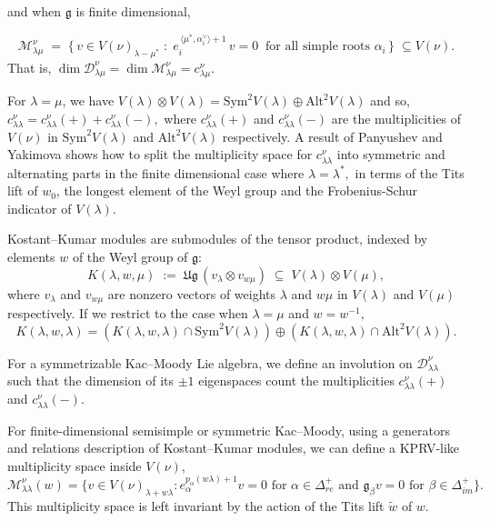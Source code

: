 \documentclass[12pt,reqno]{amsart}
\theoremstyle{plain}
\theoremstyle{definition}
\theoremstyle{plain}
\newcommand{\posreal}[1][+]{\Delta_{re}^{#1}}
\newcommand{\posimag}{\Delta_{im}^+}
\newcommand{\lie}{\mathfrak}
\newcommand{\lr}{c_{\lambda\mu}^\nu}
\begin{document}
and when $\mathfrak g$ is finite dimensional, 

\[
    \mathcal{M}_{\lambda\mu}^{\nu} \;=\;\bigl\{\,v\in V(\nu)_{\lambda-\mu^*}\;:\;
    e_i^{\,\langle\mu^*,\alpha_i^\vee\rangle+1}\,v=0\ \text{ for all simple roots } \alpha_i\,\bigr\} \;\subseteq V(\nu).
\] 
That is, $\dim \mathcal{D}_{\lambda\mu}^{\nu}=\dim \mathcal{M}_{\lambda\mu}^{\nu}=\lr.$ 



For $\lambda=\mu$, we have $V(\lambda)\otimes V(\lambda)= \text{Sym}^2 V(\lambda)\oplus \text{Alt}^2V(\lambda)$ and so, $c_{\lambda\lambda}^\nu=c_{\lambda\lambda}^{\nu}(+) + c_{\lambda\lambda}^{\nu}(-),$ where $c_{\lambda\lambda}^{\nu}(+)$ and $c_{\lambda\lambda}^{\nu}(-)$ are the multiplicities of $V(\nu)$ in $\text{Sym}^2 V(\lambda)$ and $\text{Alt}^2V(\lambda)$ respectively. A result of Panyushev and Yakimova shows how to split the multiplicity space for $c_{\lambda\lambda}^{\nu}$ into symmetric and alternating parts in the finite dimensional case where $\lambda=\lambda^*,$ in terms of the Tits lift of $w_0$, the longest element of the Weyl group and the Frobenius-Schur indicator of $V(\lambda).$

Kostant--Kumar modules are submodules of the tensor product, indexed by elements $w$ of the Weyl group of $\lie g$:
\[
    K(\lambda,w,\mu)\;:=\;\lie{Ug}\,(v_\lambda\otimes v_{w\mu})
    \;\subseteq\; V(\lambda)\otimes V(\mu),
\]
where $v_\lambda$ and $v_{w\mu}$ are nonzero vectors of weights $\lambda$
and $w\mu$ in $V(\lambda)$ and $V(\mu)$ respectively. 
If we restrict to the case when $\lambda=\mu$ and $w=w^{-1},$ $$K(\lambda, w, \lambda)= (K(\lambda, w, \lambda)\cap \text{Sym}^2V(\lambda)) \oplus (K(\lambda, w, \lambda)\cap \text{Alt}^2V(\lambda)).$$ 

For a symmetrizable Kac--Moody Lie algebra, we define an involution on $\mathcal{D}_{\lambda\lambda}^{\nu}$ such that the dimension of its $\pm 1$ eigenspaces count the multiplicities $c_{\lambda\lambda}^{\nu}(+)$ and $ c_{\lambda\lambda}^{\nu}(-).$

For finite-dimensional semisimple or symmetric Kac--Moody, using a generators and relations description of Kostant--Kumar modules, we can define a KPRV-like multiplicity space inside $V
(\nu)$, $$\mathcal{M}_{\lambda\lambda}^{\nu}(w)=\{v \in V(\nu)_{\lambda+w\lambda}: e_\alpha^{p_\alpha(w\lambda)+1} v =0 \text{ for } \alpha \in \posreal \text{ and } {\lie g}_{\beta} v =0 \text{ for } \beta \in \posimag\}.$$ This multiplicity space is left invariant by the action of the Tits lift $\widetilde{w}$ of $w.$ 
\end{document}
